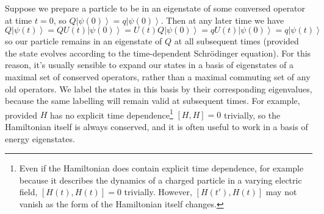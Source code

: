 \documentclass{article}
\theoremstyle{plain}\theoremheaderfont{\normalfont\itshape}\theorembodyfont{\rmfamily}\theoremseparator{.}\newtheorem*{rem}{Remark}\newtheorem*{ex}{Example}\newtheorem*{proof}{Proof}\newtheorem*{altp}{Alternative proof}
\theoremstyle{plain}\theoremheaderfont{\normalfont\bfseries}\theorembodyfont{\rmfamily}\theoremseparator{.}\newtheorem{thm}{Theorem}[section]\newtheorem{lem}[thm]{Lemma}\newtheorem{prop}[thm]{Proposition}\newtheorem*{cor}{Corollary}\newtheorem{defn}[thm]{Definition}\newtheorem{clm}[thm]{Claim}\newtheorem{clminproof}{Claim}
\theoremstyle{break}\theoremheaderfont{\normalfont\itshape}\theorembodyfont{\rmfamily}\theoremseparator{.\medskip}\newtheorem*{proofskip}{Proof}\newtheorem*{exs}{Examples}\newtheorem*{rems}{Remarks}
\theoremstyle{break}\theoremheaderfont{\normalfont\bfseries}\theorembodyfont{\rmfamily}\theoremseparator{.\medskip}\newtheorem{lemskip}[thm]{Lemma}\newtheorem{defnskip}[thm]{Definition}\newtheorem{propskip}[thm]{Proposition}\newtheorem{thmskip}[thm]{Theorem}
\numberwithin{equation}{section}
\newcommand{\ket}[1]{\left| #1 \right\rangle}
\begin{document}
    Suppose we prepare a particle to be in an eigenstate of some conversed operator at time \(t=0\), so \(Q\ket{\psi(0)}=q\ket{\psi(0)}\). Then at any later time we have
    \begin{equation}
        Q\ket{\psi(t)}=QU(t)\ket{\psi(0)}=U(t)Q\ket{\psi(0)}=qU(t)\ket{\psi(0)}=q\ket{\psi(t)}
    \end{equation}
    so our particle remains in an eigenstate of \(Q\) at all subsequent times (provided the state evolves according to the time-dependent Schr\"{o}dinger equation). For this reason, it's usually sensible to expand our states in a basis of eigenstates of a maximal set of conserved operators, rather than a maximal commuting set of any old operators. We label the states in this basis by their corresponding eigenvalues, because the same labelling will remain valid at subsequent times. For example, provided \(H\) has no explicit time dependence\footnote{Even if the Hamiltonian does contain explicit time dependence, for example because it describes the dynamics of a charged particle in a varying electric field, \([H(t),H(t)]=0\) trivially. However, \([H(t'),H(t)]\) may not vanish as the form of the Hamiltonian itself changes.} \([H,H]=0\) trivially, so the Hamiltonian itself is always conserved, and it is often useful to work in a basis of energy eigenstates.
\end{document}
